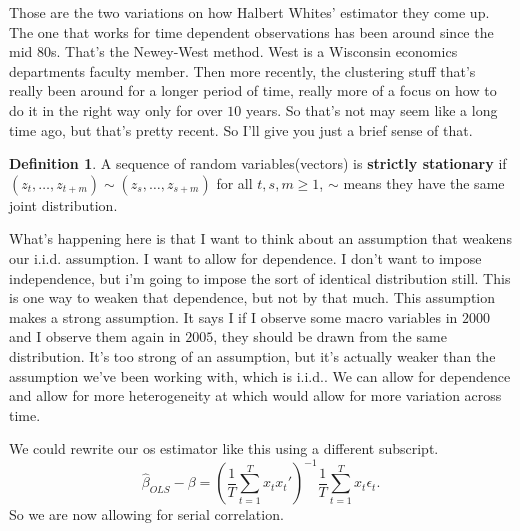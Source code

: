 \documentclass[11pt,a4paper]{amsart}
\theoremstyle{plain}
\theoremstyle{definition}
\newtheorem{definition}{Definition}
\begin{document}
   		 	 Those are the two variations on how Halbert Whites' estimator they come up. The one that works for time dependent observations has been around since the mid $80$s. That's the Newey-West method. West is a Wisconsin economics departments faculty member. Then more recently, the clustering stuff that's really been around for a longer period of time, really more of a focus on how to do it in the right way only for over $10$ years. So that's not may seem like a long time ago, but that's pretty recent.  So I'll give you just a brief sense of that. 
   		 	 \begin{definition}
   		 	 	A sequence of random variables(vectors) is \textbf{strictly stationary} if $(z_{t}, \dots, z_{t+m}) \sim (z_{s}, \dots, z_{s+m})$ for all $t,s, m \geq 1$, $\sim$ means they have the same joint distribution.
   		 	 \end{definition}
   	 	 	 What's happening here is that I want to think about an assumption that weakens our i.i.d. assumption.  I want to allow for dependence. I don't want to impose independence, but i'm going to impose the sort of identical distribution still. This is one way to weaken that dependence, but not by that much. This assumption makes a strong assumption. It says I if I observe some macro variables in $2000$ and I observe them again in $2005$, they should be drawn from the same distribution. It's too strong of an assumption, but it's actually weaker than the assumption we've been working with, which is i.i.d.. We can allow for dependence and allow for more heterogeneity at which would allow for more variation across time.\par 
   	 	 	 We could rewrite our os estimator like this using a different subscript.
   	 	 	\begin{equation}\label{beta hat minus beta,sc}
   	 	 	\hat{\beta}_{OLS} - \beta = (\frac{1}{T}\sum_{t=1}^{T}x_{t}x_{t}')^{-1}\frac{1}{T}\sum_{t=1}^{T}x_{t}\epsilon_{t}.
   	 	 	\end{equation}
   	 	 	 So we are now allowing for serial correlation. 
\end{document}
